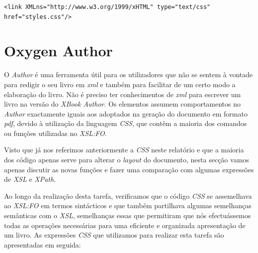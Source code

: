 \documentclass[a4paper]{article}
\begin{document}
\begin{small}                        
\begin{lstlisting}
<link XMLns="http://www.w3.org/1999/xHTML" type="text/css" href="styles.css"/>
\end{lstlisting}
\end{small}

\newpage

\section{\LARGE Oxygen Author}

\hspace{1cm}O \emph{Author} é uma ferramenta útil para os utilizadores que não se sentem à vontade para redigir o seu livro em \emph{xml} e também para facilitar de um certo modo a elaboração do livro. Não é preciso ter conhecimentos de \emph{xml} para escrever um livro na versão do \emph{XBook Author}. Os elementos assumem comportamentos no \emph{Author} exactamente iguais aos adoptados na geração do documento em formato \emph{pdf}, devido à utilização da linguagem \emph{CSS}, que contêm
a maioria dos comandos ou funções utilizadas no \emph{XSL:FO}.

\hspace{1cm}Visto que já nos referimos anteriormente a \emph{CSS} neste relatório e que a maioria dos código apenas serve para alterar o \emph{layout} do documento, nesta secção vamos apenas discutir as novas funções e fazer uma comparação com algumas expressões de \emph{XSL} e \emph{XPath}.
                
\hspace{1cm}Ao longo da realização desta tarefa, verificamos que o código \emph{CSS} se assemelhava ao \emph{XSL:FO} em termos sintácticos e que também partilhava algumas semelhanças semânticas com o \emph{XSL}, semelhanças essas que permitiram que nós efectuássemos todas as operações necessárias para uma eficiente e organizada apresentação de um livro. As expressões \emph{CSS} que utilizamos para realizar esta tarefa são apresentadas em seguida:\\
\end{document}
